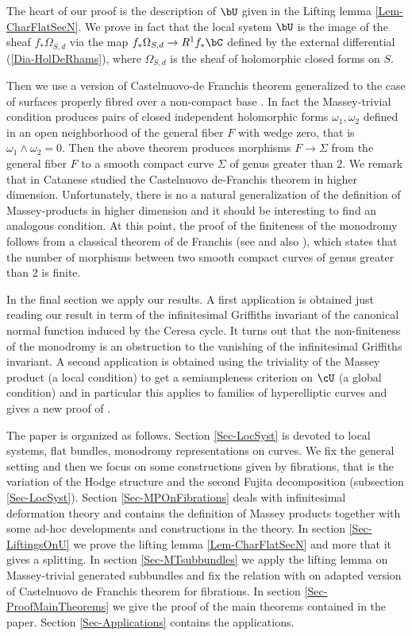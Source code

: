 \documentclass[a4paper,11pt]{amsart}
\begin{document}
{The heart of our proof is the description of $\bU$ given in the Lifting lemma \ref{Lem-CharFlatSecN}. We prove in fact that the local system $\bU$  is the image of the sheaf $f_\ast\Omega_{S,d}$ via the map $f_\ast\Omega_{S,d}\to R^1f_\ast\bC$ defined by the external differential (\ref{Dia-HolDeRhams}),
 where $\Omega_{S,d}$ is the sheaf of holomorphic closed forms on $S.$  

Then we use a version of Castelnuovo-de Franchis theorem generalized to the case of surfaces properly fibred over a non-compact base \cite{GonStopTor-On}.
In fact the Massey-trivial condition produces pairs of closed independent holomorphic forms $\omega_1,\omega_2$ defined in an open neighborhood of the general fiber $F$ with wedge zero, that is $\omega_1\wedge \omega_2=0.$ Then the above theorem produces morphisms $F\to \Sigma$ from the general fiber $F$ to a smooth compact curve  $\Sigma$ of genus greater than $2.$ We remark that in \cite{Cat_Moduli_1991} Catanese studied the Castelnuovo de-Franchis theorem in higher dimension. Unfortunately, there is no a natural generalization of the definition of Massey-products in higher dimension and it should be interesting to find an analogous condition. 
At this point, the proof of the finiteness of the monodromy follows from a classical theorem of de Franchis (see \cite{Martens_Obervations_1988} and also \cite{AlzatiPirola_Some_1991}), which states that the number of morphisms between two smooth compact curves of genus greater than $2$ is finite. 

In the final section we apply our results. A first application is obtained just reading our result in term of the infinitesimal Griffiths invariant of the  canonical normal function induced by the Ceresa cycle. It turns out that the non-finiteness of the monodromy is an obstruction to the vanishing of the infinitesimal Griffiths invariant. 
A second application is obtained using the triviality of the Massey product (a local condition) to get a semiampleness criterion on $\cU$ (a global condition) and in particular this applies to families of hyperelliptic curves and gives a new proof of \cite[Theorem A.1]{LuZuo_OnTheSlope_2017}.

The paper is organized as follows. Section 
\ref{Sec-LocSyst} is devoted to local systems, flat bundles, monodromy representations on curves. We fix the general setting and then we focus on some constructions given by fibrations, that is the variation of the Hodge structure and the second Fujita decomposition (subsection \ref{Sec-LocSyst}). Section \ref{Sec-MPOnFibrations} deals with infinitesimal deformation theory and contains the definition of Massey products together with some ad-hoc developments and constructions in the theory. In section \ref{Sec-LiftingsOnU} we prove the lifting lemma \ref{Lem-CharFlatSecN} and more that it gives a splitting. In section \ref{Sec-MTsubbundles} we apply the lifting lemma on Massey-trivial generated subbundles and fix the relation with on adapted version of Castelnuovo de Franchis theorem for fibrations. In section \ref{Sec-ProofMainTheorems} we give the proof of the main theorems contained in the paper. Section \ref{Sec-Applications} contains the applications.


}
\end{document}
